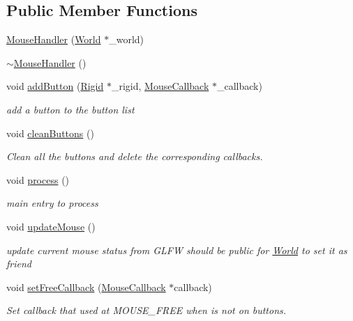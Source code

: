 \subsection*{Public Member Functions}
\begin{DoxyCompactItemize}
\item 
\hyperlink{classMouseHandler_a2c79a128cb7e48f556cb228a3b14f291}{Mouse\+Handler} (\hyperlink{classWorld}{World} $\ast$\+\_\+world)
\item 
\hyperlink{classMouseHandler_a316de94666a31919abaadbb3ff16a18f}{$\sim$\+Mouse\+Handler} ()
\item 
void \hyperlink{classMouseHandler_a27fd9eb5eba52764d5ff6245018ee228}{add\+Button} (\hyperlink{classRigid}{Rigid} $\ast$\+\_\+rigid, \hyperlink{classMouseCallback}{Mouse\+Callback} $\ast$\+\_\+callback)
\begin{DoxyCompactList}\small\item\em add a button to the button list \end{DoxyCompactList}\item 
void \hyperlink{classMouseHandler_aece2b15ab5c31a8cc1befc5f18133f27}{clean\+Buttons} ()
\begin{DoxyCompactList}\small\item\em Clean all the buttons and delete the corresponding callbacks. \end{DoxyCompactList}\item 
void \hyperlink{classMouseHandler_a367ef9b85ee425a85beefdbd16a39768}{process} ()
\begin{DoxyCompactList}\small\item\em main entry to process \end{DoxyCompactList}\item 
void \hyperlink{classMouseHandler_a0a7df02e71fbbb14f5a80163ee065c8b}{update\+Mouse} ()
\begin{DoxyCompactList}\small\item\em update current mouse status from G\+L\+F\+W should be public for \hyperlink{classWorld}{World} to set it as friend \end{DoxyCompactList}\item 
void \hyperlink{classMouseHandler_a24de5aaed3df346eae098cd830f168dd}{set\+Free\+Callback} (\hyperlink{classMouseCallback}{Mouse\+Callback} $\ast$callback)
\begin{DoxyCompactList}\small\item\em Set callback that used at M\+O\+U\+S\+E\+\_\+\+F\+R\+E\+E when is not on buttons. \end{DoxyCompactList}\item 

\end{DoxyCompactItemize}
